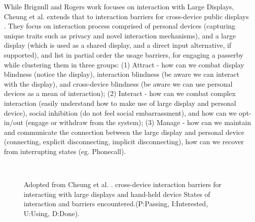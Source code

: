 While Brignull and Rogers work focuses on interaction with Large Displays, Cheung et al.  extends that to interaction barriers for cross-device public displays \cite{Cheung:2014}. They focus on interaction process comprised of personal devices (capturing unique traits such as privacy and novel interaction mechanisms), and a large display (which is used as a shared display, and a direct input alternative, if supported), and list in partial order the usage barriers, for engaging a passerby while clustering them in three groups: (1) Attract - how can we combat display blindness (notice the display), interaction blindness (be aware we can interact with the display), and cross-device blindness (be aware we can use personal devices as a mean of interaction); (2) Interact - how can we combat complex interaction (easily understand how to make use of large display and personal device), social inhibition (do not feel social embarrassment),  and how can we opt-in/out (engage or withdraw from the system); (3) Manage - how can we maintain and communicate the connection between the large display and personal device (connecting, explicit disconnecting, implicit disconnecting), how can we recover from interrupting states (eg. Phonecall). 

\begin{figure}[H]
	\centering
	\\ 
	\caption{
		Adopted from Cheung et al. \protect\cite{Cheung:2014}.
		\protect{} cross-device interaction barriers for interacting with large displays and hand-held device
		\protect{} States  of interaction and barriers encountered.(P:Passing, I:Interested, U:Using, D:Done).
		}
	\label{fig:Cheung et al. ideas}
\end{figure}

